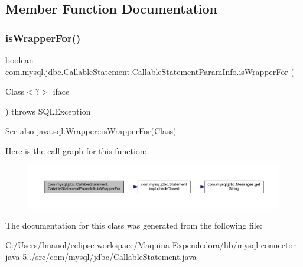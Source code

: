 \subsection{Member Function Documentation}
\mbox{\label{classcom_1_1mysql_1_1jdbc_1_1_callable_statement_1_1_callable_statement_param_info_a4bd267bd570090dd11271f8186a5c1c1}} 
\subsubsection{\texorpdfstring{is\+Wrapper\+For()}{isWrapperFor()}}
{\footnotesize\ttfamily boolean com.\+mysql.\+jdbc.\+Callable\+Statement.\+Callable\+Statement\+Param\+Info.\+is\+Wrapper\+For (\begin{DoxyParamCaption}\item[{Class$<$?$>$}]{iface }\end{DoxyParamCaption}) throws S\+Q\+L\+Exception}

\begin{DoxySeeAlso}{See also}
java.\+sql.\+Wrapper\+::is\+Wrapper\+For(\+Class) 
\end{DoxySeeAlso}
Here is the call graph for this function\+:\nopagebreak
\begin{figure}[H]
\begin{center}
\leavevmode
\includegraphics[width=350pt]{classcom_1_1mysql_1_1jdbc_1_1_callable_statement_1_1_callable_statement_param_info_a4bd267bd570090dd11271f8186a5c1c1_cgraph}
\end{center}
\end{figure}


The documentation for this class was generated from the following file\+:\begin{DoxyCompactItemize}
\item 
C\+:/\+Users/\+Imanol/eclipse-\/workspace/\+Maquina Expendedora/lib/mysql-\/connector-\/java-\/5../src/com/mysql/jdbc/Callable\+Statement.\+java\end{DoxyCompactItemize}
